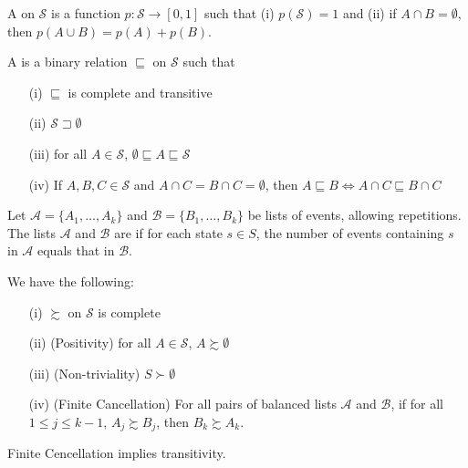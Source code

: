 \documentclass[12pt]{article}
\begin{document}
\begin{definition}
	A  on $\mathcal{S}$ is a function $p : \mathcal{S} \to [0,1]$ such that (i) $p(\mathcal{S}) = 1$ and (ii) if $A \cap B = \emptyset$, then $p(A \cup B) = p(A) + p(B)$.
\end{definition}
\begin{definition}
	A  is a binary relation $\sqsubseteq$ on $\mathcal{S}$ such that
	\begin{itemize}
		\item[(i)] $\sqsubseteq$ is complete and transitive
		\item[(ii)] $\mathcal{S} \sqsupset \emptyset$
		\item[(iii)] for all $A \in \mathcal{S}$, $\emptyset \sqsubseteq A \sqsubseteq \mathcal{S}$
		\item[(iv)] If $A,B,C \in \mathcal{S}$ and $A \cap C = B \cap C = \emptyset$, then $A \sqsubseteq B \Longleftrightarrow A \cap C \sqsubseteq B \cap C$
	\end{itemize}
\end{definition}

\begin{definition}
	Let $\mathcal{A} = \{A_1,\dots,A_k\}$ and $\mathcal{B} = \{B_1,\dots,B_k\}$ be lists of events, allowing repetitions. The lists $\mathcal{A}$ and $\mathcal{B}$ are  if for each state $s \in S$, the number of events containing $s$ in $\mathcal{A}$ equals that in $\mathcal{B}$.
\end{definition}

\begin{assumption}\label{ass:mathprob}
	We have the following:
	
	\begin{itemize}
		\item[(i)] $\succsim$ on $\mathcal{S}$ is complete
		\item[(ii)] (Positivity) for all $A \in \mathcal{S}$, $A \succsim \emptyset$
		\item[(iii)] (Non-triviality) $S \succ \emptyset$
		\item[(iv)] (Finite Cancellation) For all pairs of balanced lists $\mathcal{A}$ and $\mathcal{B}$, if for all $1 \le j \le k-1$, $A_j \succsim B_j$, then $B_k \succsim A_k$.
	\end{itemize}
\end{assumption}
\begin{remark}
	Finite Cencellation implies transitivity. 
\end{remark}
\end{document}
